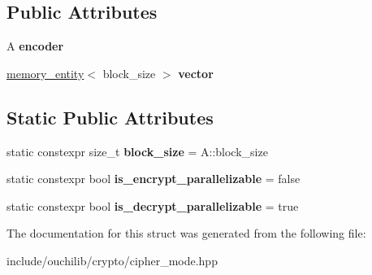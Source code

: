 \subsection*{Public Attributes}
\begin{DoxyCompactItemize}
\item 
\mbox{\label{structouchi_1_1crypto_1_1cbc_a06249c383efe4ee7bcd095f455761cf7}} 
A {\bfseries encoder}
\item 
\mbox{\label{structouchi_1_1crypto_1_1cbc_a5908ae990a035f18675fd828b9f1127b}} 
\mbox{\hyperlink{structouchi_1_1crypto_1_1memory__entity}{memory\+\_\+entity}}$<$ block\+\_\+size $>$ {\bfseries vector}
\end{DoxyCompactItemize}
\subsection*{Static Public Attributes}
\begin{DoxyCompactItemize}
\item 
\mbox{\label{structouchi_1_1crypto_1_1cbc_a2d4a95e5db28717fb3ddc5c6c2b90a9b}} 
static constexpr size\+\_\+t {\bfseries block\+\_\+size} = A\+::block\+\_\+size
\item 
\mbox{\label{structouchi_1_1crypto_1_1cbc_a7a1b8d8ef5d4ec9fad3ff801b80e549d}} 
static constexpr bool {\bfseries is\+\_\+encrypt\+\_\+parallelizable} = false
\item 
\mbox{\label{structouchi_1_1crypto_1_1cbc_a526f506e77ef1ec8683263233e99063d}} 
static constexpr bool {\bfseries is\+\_\+decrypt\+\_\+parallelizable} = true
\end{DoxyCompactItemize}


The documentation for this struct was generated from the following file\+:\begin{DoxyCompactItemize}
\item 
include/ouchilib/crypto/cipher\+\_\+mode.\+hpp\end{DoxyCompactItemize}
